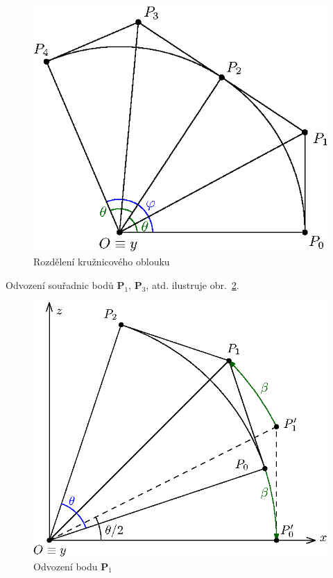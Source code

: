 \begin{figure}[!h]
	\begin{center}
		\includegraphics*[]{obr/rozdeleni}
	\end{center}
	\caption{Rozdělení kružnicového oblouku}
	\label{rozdeleni}
\end{figure}
%
Odvození souřadnic bodů $\mathbf{P}_1$, $\mathbf{P}_3$, atd. ilustruje obr.~\ref{obrRotace}.
\begin{figure}[!h]
	\begin{center}
		\includegraphics*[]{obr/rotace}
	\end{center}
	\caption{Odvození bodu $\mathbf{P}_1$}
	\label{obrRotace}
\end{figure}\\
